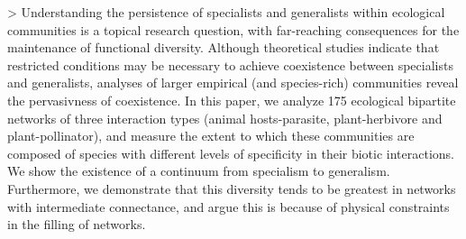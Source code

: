 > Understanding the persistence of specialists and generalists within
ecological communities is a topical research question, with far-reaching
consequences for the maintenance of functional diversity. Although theoretical
studies indicate that restricted conditions may be necessary to achieve
coexistence between specialists and generalists, analyses of larger empirical
(and species-rich) communities reveal the pervasivness of coexistence. In this
paper, we analyze 175 ecological bipartite networks of three interaction types
(animal hosts-parasite, plant-herbivore and plant-pollinator), and measure
the extent to which these communities are composed of species with different
levels of specificity in their biotic interactions. We show the existence of
a continuum from specialism to generalism. Furthermore, we demonstrate that
this diversity tends to be greatest in networks with intermediate connectance,
and argue this is because of physical constraints in the filling of networks.
